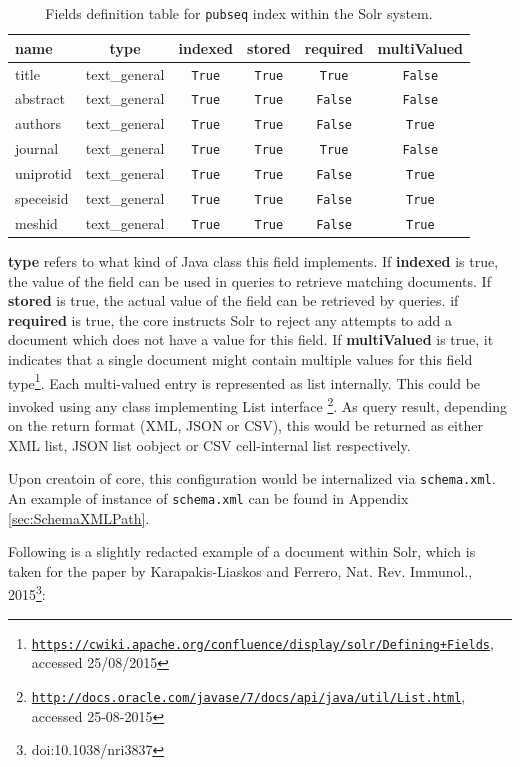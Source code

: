 \begin{table}[htbp]
\caption{Fields definition table for \texttt{pubseq} index within the Solr system.}
\centering
\begin{tabular}{| l | c | c | c | c | c |}
  \hline
  name & type & indexed & stored & required & multiValued \\
  \hline
  \hline
  title & text\_general & \texttt{True} & \texttt{True} & \texttt{True} & \texttt{False} \\
  \hline
  abstract & text\_general & \texttt{True} & \texttt{True} & \texttt{False} & \texttt{False} \\
  \hline
  authors & text\_general & \texttt{True} & \texttt{True} & \texttt{False} & \texttt{True} \\
  \hline
  journal & text\_general & \texttt{True} & \texttt{True} & \texttt{True} & \texttt{False} \\
  \hline
  uniprotid & text\_general & \texttt{True} & \texttt{True} & \texttt{False} & \texttt{True} \\
  \hline
  speceisid & text\_general & \texttt{True} & \texttt{True} & \texttt{False} & \texttt{True} \\
  \hline
  meshid & text\_general & \texttt{True} & \texttt{True} & \texttt{False} & \texttt{True} \\
  \hline
\end{tabular}
  \label{fig:ACIDvsBASE}
\end{table}

\textbf{type} refers to what kind of Java class this field implements. If \textbf{indexed} is true, the value of the field can be used in queries to retrieve matching documents. If \textbf{stored} is true, the actual value of the field can be retrieved by queries. if \textbf{required} is true, the core instructs Solr to reject any attempts to add a document which does not have a value for this field. If \textbf{multiValued} is true, it indicates that a single document might contain multiple values for this field type\footnote{\href{https://cwiki.apache.org/confluence/display/solr/Defining+Fields}{\texttt{https://cwiki.apache.org/confluence/display/solr/Defining+Fields}}, accessed 25/08/2015}. Each multi-valued entry is represented as list internally. This could be invoked using any class implementing List interface \footnote{\href{http://docs.oracle.com/javase/7/docs/api/java/util/List.html}{\texttt{http://docs.oracle.com/javase/7/docs/api/java/util/List.html}}, accessed 25-08-2015}. As query result, depending on the return format (XML, JSON or CSV), this would be returned as either XML list, JSON list oobject or CSV cell-internal list respectively.

Upon creatoin of core, this configuration would be internalized via \texttt{schema.xml}. An example of instance of \texttt{schema.xml} can be found in Appendix \ref{sec:SchemaXMLPath}.

Following is a slightly redacted example of a document within Solr, which is taken for the paper by Karapakis-Liaskos and Ferrero, Nat. Rev. Immunol., 2015\footnote{doi:10.1038/nri3837}:

\label{lst:MEDLINEDTD}